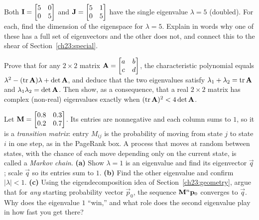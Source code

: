 \begin{exercise}
\label{ch23:ex-repeat}
Both $\mathbf{I}=\begin{bmatrix}5 & 0\\ 0 & 5\end{bmatrix}$ and
$\mathbf{J}=\begin{bmatrix}5 & 1\\ 0 & 5\end{bmatrix}$ have the single eigenvalue
$\lambda=5$ (doubled). For each, find the dimension of the eigenspace for
$\lambda=5$. Explain in words why one of these has a full set of eigenvectors and
the other does not, and connect this to the shear of Section~\ref{ch23:special}.
\end{exercise}

\begin{exercise}
\label{ch23:ex-proof}
Prove that for any $2\times 2$ matrix $\mathbf{A}=\begin{bmatrix}a&b\\c&d\end{bmatrix}$,
the characteristic polynomial equals $\lambda^2-(\operatorname{tr}\mathbf{A})\lambda+\det\mathbf{A}$,
and deduce that the two eigenvalues satisfy $\lambda_1+\lambda_2=\operatorname{tr}\mathbf{A}$ and
$\lambda_1\lambda_2=\det\mathbf{A}$. Then show, as a consequence, that a real
$2\times 2$ matrix has complex (non-real) eigenvalues exactly when
$(\operatorname{tr}\mathbf{A})^2<4\det\mathbf{A}$.
\end{exercise}

\begin{exercise}
\label{ch23:ex-markov}
Let $\mathbf{M}=\begin{bmatrix}0.8 & 0.3\\ 0.2 & 0.7\end{bmatrix}$. Its entries are
nonnegative and each column sums to $1$, so it is a \emph{transition matrix}: entry
$M_{ij}$ is the probability of moving from state $j$ to state $i$ in one step, as in
the PageRank box. A process that moves at random between states, with the chance of
each move depending only on the current state, is called a \emph{Markov chain}.
\textbf{(a)} Show $\lambda=1$ is an
eigenvalue and find its eigenvector $\vec{q}$; scale $\vec{q}$ so its entries sum to
$1$. \textbf{(b)} Find the other eigenvalue and confirm $|\lambda|<1$.
\textbf{(c)} Using the eigendecomposition idea of
Section~\ref{ch23:geometry}, argue that for \emph{any} starting probability vector
$\vec{p}_0$, the sequence $\mathbf{M}^n\mathbf{p}_0$ converges to $\vec{q}$. Why does the
eigenvalue $1$ ``win,'' and what role does the second eigenvalue play in how fast
you get there?
\end{exercise}

